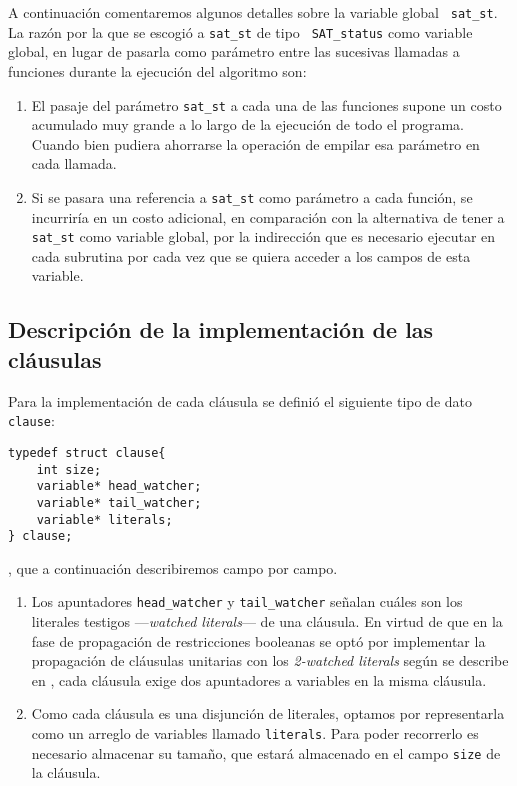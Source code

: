 \documentclass[12pt,lettersize]{article}
\begin{document}
A continuación comentaremos algunos detalles sobre la variable global {\tt
  sat\_st}. La razón por la que se escogió a {\tt sat\_st} de tipo {\tt
  SAT\_status} como variable global, en lugar de pasarla como parámetro entre
las sucesivas llamadas a funciones durante la ejecución del algoritmo son:
\begin{enumerate}
\item El pasaje del parámetro {\tt sat\_st} a cada una de las funciones supone
  un costo acumulado muy grande a lo largo de la ejecución de todo el
  programa. Cuando bien pudiera ahorrarse la operación de empilar esa parámetro
  en cada llamada.
\item Si se pasara una referencia a {\tt sat\_st} como parámetro a cada función,
  se incurriría en un costo adicional, en comparación con la alternativa de
  tener a {\tt sat\_st} como variable global, por la indirección que es
  necesario ejecutar en cada subrutina por cada vez que se quiera acceder a los
  campos de esta variable.
\end{enumerate}

\subsection{Descripción de la implementación de las cláusulas}

Para la implementación de cada cláusula se definió el siguiente tipo de dato
{\tt clause}:
\begin{lstlisting}
typedef struct clause{
    int size;
    variable* head_watcher;
    variable* tail_watcher;
    variable* literals;
} clause;
\end{lstlisting}
, que a continuación describiremos campo por campo.\vspace{-2.5mm}
\begin{enumerate}
\item Los apuntadores {\tt head\_watcher} y {\tt tail\_watcher} señalan cuáles
  son los literales testigos ---\emph{watched literals}--- de una cláusula. En
  virtud de que en la fase de propagación de restricciones booleanas se optó por
  implementar la propagación de cláusulas unitarias con los \emph{2-watched
    literals} según se describe en \cite{Zhang},
  cada cláusula exige dos apuntadores a variables en la misma cláusula.

\item Como cada cláusula es una disjunción de literales, optamos por
  representarla como un arreglo de variables llamado {\tt literals}. Para poder
  recorrerlo es necesario almacenar su tamaño, que estará almacenado en el campo
  {\tt size} de la cláusula.
\end{enumerate}
\end{document}
